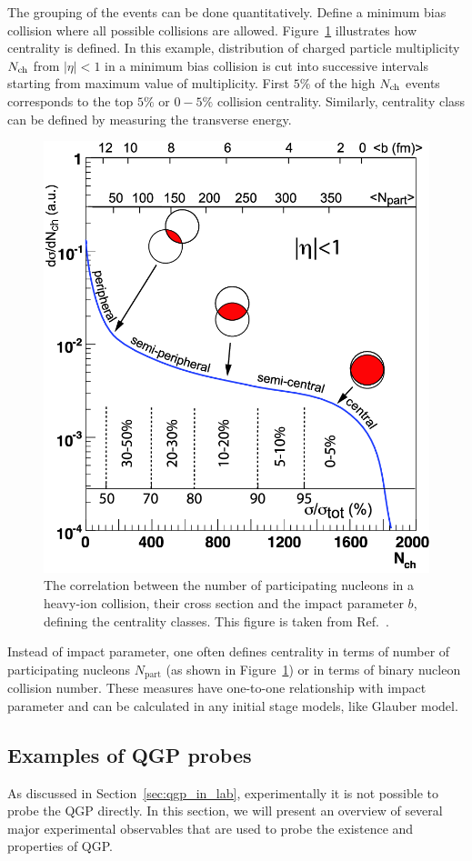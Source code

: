 The grouping of the events can be done quantitatively. Define a minimum bias collision where all possible collisions are allowed. Figure~\ref{fig:intro_HI_centrality} illustrates how centrality is defined. In this example, distribution of charged particle multiplicity $N_\text{ch}$ from $|\eta|<1$ in a minimum bias collision is cut into successive intervals starting from maximum value of multiplicity. First $5\%$ of the high $N_\text{ch}$ events corresponds to the top $5\%$ or $0-5\%$ collision centrality. Similarly, centrality class can be defined by measuring the transverse energy.

\begin{figure}[H]
\centering
\includegraphics[width=.5\linewidth]{figs/chapter_intro/HI_centrality.png}
\caption{The correlation between the number of participating nucleons in a heavy-ion collision, their cross section and the impact parameter $b$, defining the centrality classes. This figure is taken from Ref.~\cite{Betz:2009jw}.}
\label{fig:intro_HI_centrality}
\end{figure}

Instead of impact parameter, one often defines centrality in terms of number of participating nucleons $N_\text{part}$ (as shown in Figure~\ref{fig:intro_HI_centrality}) or in terms of binary nucleon collision number. These measures have one-to-one relationship with impact parameter and can be calculated in any initial stage models, like Glauber model.



\subsection{Examples of QGP probes}
\label{sec:probing_qgp}

As discussed in Section~\ref{sec:qgp_in_lab}, experimentally it is not possible to probe the QGP directly. In this section, we will present an overview of several major experimental observables that are used to probe the existence and properties of QGP.

